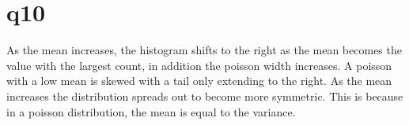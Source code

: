 \documentclass[a4paper,english]{article}
\begin{document}
    \section{q10}
        As the mean increases, the histogram shifts to the right as the mean becomes the value with the largest count, in addition
        the poisson width increases. A poisson with a low mean is skewed with a tail only extending to the right. As the mean increases 
        the distribution spreads out to become more symmetric. This is because in a poisson distribution, the mean is equal to the 
        variance.
\end{document}
